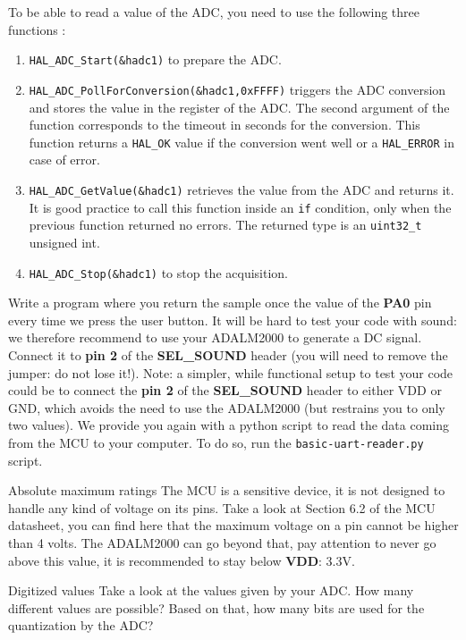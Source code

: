 \noindent To be able to read a value of the ADC, you need to use the following three functions :
\begin{enumerate}
    \item \texttt{HAL\_ADC\_Start(\&hadc1)} to prepare the ADC.
    \item \texttt{HAL\_ADC\_PollForConversion(\&hadc1,0xFFFF)} triggers the ADC conversion and stores the value in the register of the ADC. The second argument of the function corresponds to the timeout in seconds for the conversion. This function returns a \texttt{HAL\_OK} value if the conversion went well or a \texttt{HAL\_ERROR} in case of error.
    \item \texttt{HAL\_ADC\_GetValue(\&hadc1)} retrieves the value from the ADC and returns it. It is good practice to call this function inside an \texttt{if} condition, only when the previous function returned no errors. The returned type is an \texttt{uint32\_t} unsigned int.
    \item \texttt{HAL\_ADC\_Stop(\&hadc1)} to stop the acquisition.
 \end{enumerate}

\noindent Write a program where you return the sample once the value of the \textbf{PA0} pin every time we press the user button. It will be hard to test your code with sound: we therefore recommend to use your ADALM2000 to generate a DC signal. Connect it to \textbf{pin 2} of the \textbf{SEL\_SOUND} header (you will need to remove the jumper: do not lose it!). Note: a simpler, while functional setup to test your code could be to connect the \textbf{pin 2} of the \textbf{SEL\_SOUND} header to either VDD or GND, which avoids the need to use the ADALM2000 (but restrains you to only two values). We provide you again with a python script to read the data coming from the MCU to your computer. To do so, run the \texttt{basic-uart-reader.py} script.\\
\begin{bclogo}[couleur = gray!20, arrondi = 0.2, logo=\bcattention]{Absolute maximum ratings}
The MCU is a sensitive device, it is not designed to handle any kind of voltage on its pins. Take a look at Section 6.2 of the MCU datasheet, you can find here that the maximum voltage on a pin cannot be higher than 4 volts. The ADALM2000 can go beyond that, pay attention to never go above this value, it is recommended to stay below \textbf{VDD}: 3.3V.
\end{bclogo}
\begin{bclogo}[couleur = gray!20, arrondi = 0.2, logo=\bcquestion]{Digitized values}
Take a look at the values given by your ADC. How many different values are possible? Based on that, how many bits are used for the quantization by the ADC?
\end{bclogo}

